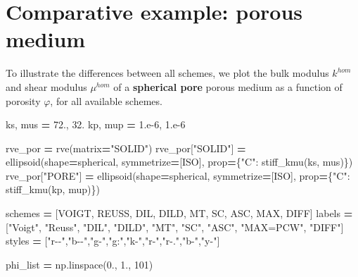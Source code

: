 \documentclass[
  a4paper,
  numbers=noendperiod,
  DIV=12]{scrreprt}
\newenvironment{Shaded}{\begin{snugshade}}{\end{snugshade}}
\newcommand{\DecValTok}[1]{\textcolor[rgb]{0.00,0.00,0.81}{#1}}
\newcommand{\FloatTok}[1]{\textcolor[rgb]{0.00,0.00,0.81}{#1}}
\newcommand{\NormalTok}[1]{#1}
\newcommand{\OperatorTok}[1]{\textcolor[rgb]{0.81,0.36,0.00}{\textbf{#1}}}
\newcommand{\StringTok}[1]{\textcolor[rgb]{0.31,0.60,0.02}{#1}}
\begin{document}
\section{Comparative example: porous
medium}\label{sec-schemes-comparison}

To illustrate the differences between all schemes, we plot the bulk
modulus \(k^{hom}\) and shear modulus \(\mu^{hom}\) of a
\textbf{spherical pore} porous medium as a function of porosity
\(\varphi\), for all available schemes.

\begin{Shaded}
\begin{Highlighting}[]
\NormalTok{ks, mus }\OperatorTok{=} \FloatTok{72.}\NormalTok{, }\FloatTok{32.}
\NormalTok{kp, mup }\OperatorTok{=} \FloatTok{1.e{-}6}\NormalTok{, }\FloatTok{1.e{-}6}

\NormalTok{rve\_por }\OperatorTok{=}\NormalTok{ rve(matrix}\OperatorTok{=}\StringTok{"SOLID"}\NormalTok{)}
\NormalTok{rve\_por[}\StringTok{"SOLID"}\NormalTok{] }\OperatorTok{=}\NormalTok{ ellipsoid(shape}\OperatorTok{=}\NormalTok{spherical, symmetrize}\OperatorTok{=}\NormalTok{[ISO],}
\NormalTok{                              prop}\OperatorTok{=}\NormalTok{\{}\StringTok{"C"}\NormalTok{: stiff\_kmu(ks, mus)\})}
\NormalTok{rve\_por[}\StringTok{"PORE"}\NormalTok{]  }\OperatorTok{=}\NormalTok{ ellipsoid(shape}\OperatorTok{=}\NormalTok{spherical, symmetrize}\OperatorTok{=}\NormalTok{[ISO],}
\NormalTok{                              prop}\OperatorTok{=}\NormalTok{\{}\StringTok{"C"}\NormalTok{: stiff\_kmu(kp, mup)\})}

\NormalTok{schemes }\OperatorTok{=}\NormalTok{ [VOIGT, REUSS, DIL, DILD, MT, SC, ASC, MAX, DIFF]}
\NormalTok{labels  }\OperatorTok{=}\NormalTok{ [}\StringTok{"Voigt"}\NormalTok{, }\StringTok{"Reuss"}\NormalTok{, }\StringTok{"DIL"}\NormalTok{, }\StringTok{"DILD"}\NormalTok{, }\StringTok{"MT"}\NormalTok{, }\StringTok{"SC"}\NormalTok{, }\StringTok{"ASC"}\NormalTok{, }\StringTok{"MAX=PCW"}\NormalTok{, }\StringTok{"DIFF"}\NormalTok{]}
\NormalTok{styles  }\OperatorTok{=}\NormalTok{ [}\StringTok{"r{-}{-}"}\NormalTok{,}\StringTok{"b{-}{-}"}\NormalTok{,}\StringTok{"g{-}"}\NormalTok{,}\StringTok{"g:"}\NormalTok{,}\StringTok{"k{-}"}\NormalTok{,}\StringTok{"r{-}"}\NormalTok{,}\StringTok{"r{-}."}\NormalTok{,}\StringTok{"b{-}"}\NormalTok{,}\StringTok{"y{-}"}\NormalTok{]}

\NormalTok{phi\_list }\OperatorTok{=}\NormalTok{ np.linspace(}\FloatTok{0.}\NormalTok{, }\FloatTok{1.}\NormalTok{, }\DecValTok{101}\NormalTok{)}


\end{Highlighting}
\end{Shaded}
\end{document}

